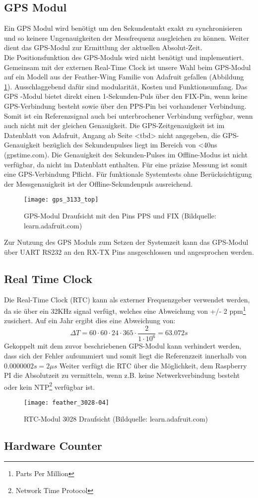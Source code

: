 \subsection{GPS Modul}
	Ein GPS Modul wird benötigt um den Sekundentakt exakt zu synchronisieren und so keinere Ungenauigkeiten der Messfrequenz ausgleichen zu können. Weiter dient das GPS-Modul zur Ermittlung der aktuellen Absolut-Zeit.\\
	Die Positionsfunktion des GPS-Moduls wird nicht benötigt und implementiert. Gemeinsam mit der externen Real-Time Clock ist unsere Wahl beim GPS-Modul auf ein Modell aus der Feather-Wing Familie von Adafruit gefallen (Abbildung \ref{fig:GPS3133}). Ausschlaggebend dafür sind modularität, Kosten und Funktionsumfang. Das GPS -Modul bietet direkt einen 1-Sekunden-Puls über den FIX-Pin, wenn keine GPS-Verbindung besteht sowie über den PPS-Pin bei vorhandener Verbindung. Somit ist ein Referenzsignal auch bei unterbrochener Verbindung verfügbar, wenn auch nicht mit der gleichen Genauigkeit. Die GPS-Zeitgenauigkeit ist im Datenblatt von Adafruit, Angang ab Seite <tbd> nicht angegeben, die GPS-Genauigkeit bezüglich des Sekundenpulses liegt im Bereich von <40ns (gpstime.com). Die Genauigkeit des Sekunden-Pulses im Offline-Modus ist nicht verfügbar, da nicht im Datenblatt enthalten. Für eine präzise Messung ist somit eine GPS-Verbindung Pflicht. Für funktionale Systemtests ohne Berücksichtigung der Messgenauigkeit ist der Offline-Sekundenpuls ausreichend.
		\begin{figure}[H]
        	\centering
        	\texttt{[image: gps\_3133\_top]}
        	\caption{GPS-Modul Draufsicht mit den Pins PPS und FIX (Bildquelle: learn.adafruit.com)}
        	\label{fig:GPS3133}
    	\end{figure}
	Zur Nutzung des GPS Moduls zum Setzen der Systemzeit kann das GPS-Modul über UART RS232 an den RX-TX Pins ansgeschlossen und angesprochen werden.    	
\subsection{Real Time Clock}
	Die Real-Time Clock (RTC) kann als externer Frequenzgeber verwendet werden, da sie über ein 32KHz signal verfügt, welches eine Abweichung von +/- 2 ppm\footnote{Parts Per Million} zusichert. Auf ein Jahr ergibt dies eine Abweichung von:
	\[
		\Delta{T} = 60 \cdot 60 \cdot 24 \cdot 365 \cdot \frac{2}{1\cdot 10^6} = 63.072s
	\]
	Gekoppelt mit dem zuvor beschriebenen GPS-Modul kann verhindert werden, dass sich der Fehler aufsummiert und somit liegt die Referenzzeit innerhalb von $0.0000002s = 2\mu{s}$ 
	Weiter verfügt die RTC über die Möglichkeit, dem Raspberry PI die Absolutzeit zu vermitteln, wenn z.B. keine Netwerkverbindung besteht oder kein NTP\footnote{Network Time Protocol} verfügbar ist.
		\begin{figure}[H]
        	\centering
        	\texttt{[image: feather\_3028-04]}
        	\caption{RTC-Modul 3028 Draufsicht (Bildquelle: learn.adafruit.com)}
        	\label{fig:RTC3028}
    	\end{figure}	
\subsection{Hardware Counter}
